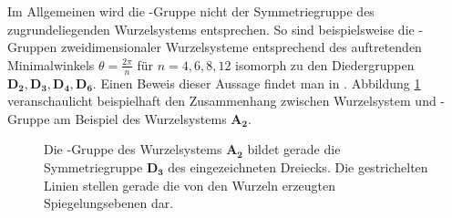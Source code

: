 \begin{bem}
  Im Allgemeinen wird die \weyl\hyp{}Gruppe nicht der Symmetriegruppe des zugrundeliegenden Wurzelsystems entsprechen.
  So sind beispielsweise die \weyl\hyp{}Gruppen zweidimensionaler Wurzelsysteme entsprechend des auftretenden Minimalwinkels $\theta = \tfrac{2\pi}{n}$ für $n = 4,6,8,12$ isomorph zu den Diedergruppen $\mathbf{D_2}, \mathbf{D_3}, \mathbf{D_4}, \mathbf{D_6}$.
  Einen Beweis dieser Aussage findet man in \cite[S.203f.]{hall2015lie}.
  Abbildung \ref{fig:symmetry} veranschaulicht beispielhaft den Zusammenhang zwischen Wurzelsystem und \weyl\hyp{}Gruppe am Beispiel des Wurzelsystems $\mathbf{A_2}$.
\end{bem}

\begin{figure}
  \centering
  \label{fig:symmetry}
  \caption{Die \weyl\hyp{}Gruppe des Wurzelsystems $\mathbf{A_2}$ bildet gerade die Symmetriegruppe $\mathbf{D_3}$ des eingezeichneten Dreiecks. Die gestrichelten Linien stellen gerade die von den Wurzeln erzeugten Spiegelungsebenen dar.}
\end{figure}

